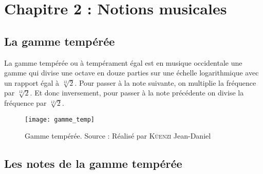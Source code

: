 \chapter{Chapitre 2 : Notions musicales}
\label{chap:2}

\section{La gamme tempérée}
\label{sec:2.1}

La gamme tempérée ou à tempérament égal est en musique occidentale une gamme qui divise une octave en douze parties sur une échelle logarithmique avec un rapport égal à $\sqrt[12]{2}$. Pour passer à la note suivante, on multiplie la fréquence par $\sqrt[12]{2}$. Et donc inversement, pour passer à la note précédente on divise la fréquence par $\sqrt[12]{2}$.

\begin{figure}[H]
	\centering
	\texttt{[image: gamme\_temp]}
	\caption[Gamme tempérée]{Gamme tempérée. Source : Réalisé par \textsc{Küenzi} Jean-Daniel}
	\label{fig:gammetemp}
\end{figure}

\section{Les notes de la gamme tempérée}
\label{sec:2.2}

